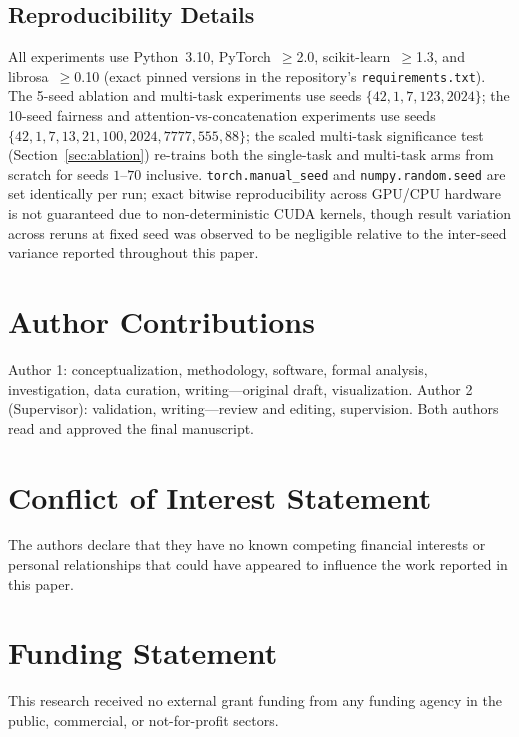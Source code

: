\documentclass[5p,twocolumn]{elsarticle}
\begin{document}
\subsection*{Reproducibility Details}
All experiments use Python~3.10, PyTorch~$\geq$2.0, scikit-learn~$\geq$1.3,
and librosa~$\geq$0.10 (exact pinned versions in the repository's
\texttt{requirements.txt}). The 5-seed ablation and multi-task
experiments use seeds $\{42, 1, 7, 123, 2024\}$; the 10-seed fairness
and attention-vs-concatenation experiments use seeds
$\{42,1,7,13,21,100,2024,7777,555,88\}$; the scaled multi-task
significance test (Section~\ref{sec:ablation}) re-trains both the
single-task and multi-task arms from scratch for seeds $1$--$70$
inclusive. \texttt{torch.manual\_seed}
and \texttt{numpy.random.seed} are set identically per run; exact
bitwise reproducibility across GPU/CPU hardware is not guaranteed
due to non-deterministic CUDA kernels, though result variation across
reruns at fixed seed was observed to be negligible relative to the
inter-seed variance reported throughout this paper.

\section*{Author Contributions}
Author 1: conceptualization, methodology, software, formal
analysis, investigation, data curation, writing---original draft,
visualization. Author 2 (Supervisor): validation, writing---review
and editing, supervision. Both authors read and approved the final
manuscript.

\section*{Conflict of Interest Statement}
The authors declare that they have no known competing financial
interests or personal relationships that could have appeared to
influence the work reported in this paper.

\section*{Funding Statement}
This research received no external grant funding from any
funding agency in the public, commercial, or not-for-profit
sectors.

\end{document}
